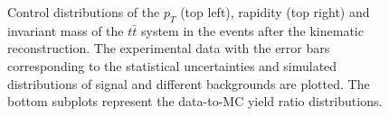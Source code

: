 \begin{figure}[h]
\begin{subfigure}
\end{subfigure}
\caption{Control distributions of the $p_{T}$ (top left), rapidity (top right) and invariant mass of the $t\bar{t}$ system in the events 
 after the kinematic reconstruction. The experimental data with the error bars corresponding to the statistical uncertainties
 and simulated distributions of signal and different backgrounds are plotted. The bottom subplots represent the data-to-MC yield ratio distributions.}
\label{fig:CPkinTTbar}
\end{figure}